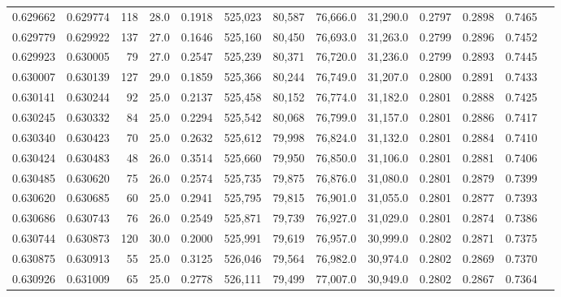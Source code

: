 \begin{tabular}{rrrrrrrrrrrrr}
0.629662 & 0.629774 &   118 & 28.0 &                                     0.1918 & 525,023 &  80,587 &  76,666.0 &  31,290.0 & 0.2797 & 0.2898 & 0.7465 \\
0.629779 & 0.629922 &   137 & 27.0 &                                     0.1646 & 525,160 &  80,450 &  76,693.0 &  31,263.0 & 0.2799 & 0.2896 & 0.7452 \\
0.629923 & 0.630005 &    79 & 27.0 &                                     0.2547 & 525,239 &  80,371 &  76,720.0 &  31,236.0 & 0.2799 & 0.2893 & 0.7445 \\
0.630007 & 0.630139 &   127 & 29.0 &                                     0.1859 & 525,366 &  80,244 &  76,749.0 &  31,207.0 & 0.2800 & 0.2891 & 0.7433 \\
0.630141 & 0.630244 &    92 & 25.0 &                                     0.2137 & 525,458 &  80,152 &  76,774.0 &  31,182.0 & 0.2801 & 0.2888 & 0.7425 \\
0.630245 & 0.630332 &    84 & 25.0 &                                     0.2294 & 525,542 &  80,068 &  76,799.0 &  31,157.0 & 0.2801 & 0.2886 & 0.7417 \\
0.630340 & 0.630423 &    70 & 25.0 &                                     0.2632 & 525,612 &  79,998 &  76,824.0 &  31,132.0 & 0.2801 & 0.2884 & 0.7410 \\
0.630424 & 0.630483 &    48 & 26.0 &                                     0.3514 & 525,660 &  79,950 &  76,850.0 &  31,106.0 & 0.2801 & 0.2881 & 0.7406 \\
0.630485 & 0.630620 &    75 & 26.0 &                                     0.2574 & 525,735 &  79,875 &  76,876.0 &  31,080.0 & 0.2801 & 0.2879 & 0.7399 \\
0.630620 & 0.630685 &    60 & 25.0 &                                     0.2941 & 525,795 &  79,815 &  76,901.0 &  31,055.0 & 0.2801 & 0.2877 & 0.7393 \\
0.630686 & 0.630743 &    76 & 26.0 &                                     0.2549 & 525,871 &  79,739 &  76,927.0 &  31,029.0 & 0.2801 & 0.2874 & 0.7386 \\
0.630744 & 0.630873 &   120 & 30.0 &                                     0.2000 & 525,991 &  79,619 &  76,957.0 &  30,999.0 & 0.2802 & 0.2871 & 0.7375 \\
0.630875 & 0.630913 &    55 & 25.0 &                                     0.3125 & 526,046 &  79,564 &  76,982.0 &  30,974.0 & 0.2802 & 0.2869 & 0.7370 \\
0.630926 & 0.631009 &    65 & 25.0 &                                     0.2778 & 526,111 &  79,499 &  77,007.0 &  30,949.0 & 0.2802 & 0.2867 & 0.7364 \\

\end{tabular}
